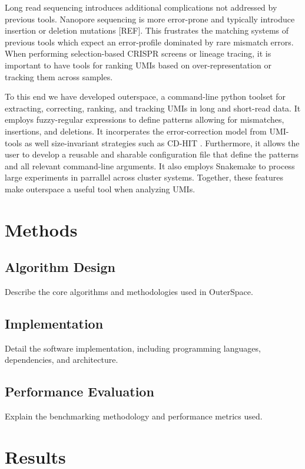 \documentclass[9pt,twocolumn,twoside]{extarticle}
\begin{document}
Long read sequencing introduces additional complications not addressed by previous tools.
Nanopore sequencing is more error-prone and typically introduce insertion or deletion mutations [REF].
This frustrates the matching systems of previous tools which expect an error-profile dominated by rare mismatch errors.
When performing selection-based CRISPR screens or lineage tracing, it is important to have tools for ranking UMIs based on over-representation or tracking them across samples.

To this end we have developed outerspace, a command-line python toolset for extracting, correcting, ranking, and tracking UMIs in long and short-read data.
It employs fuzzy-regular expressions to define patterns allowing for mismatches, insertions, and deletions.
It incorperates the error-correction model from UMI-tools as well size-invariant strategies such as CD-HIT \cite{li2006cdhit}. %
Furthermore, it allows the user to develop a reusable and sharable configuration file that define the patterns and all relevant command-line arguments.
It also employs Snakemake to process large experiments in parrallel across cluster systems.
Together, these features make outerspace a useful tool when analyzing UMIs.

\section{Methods}

\subsection{Algorithm Design}

Describe the core algorithms and methodologies used in OuterSpace.

\subsection{Implementation}

Detail the software implementation, including programming languages, dependencies, and architecture.

\subsection{Performance Evaluation}

Explain the benchmarking methodology and performance metrics used.

\section{Results}
\end{document}
